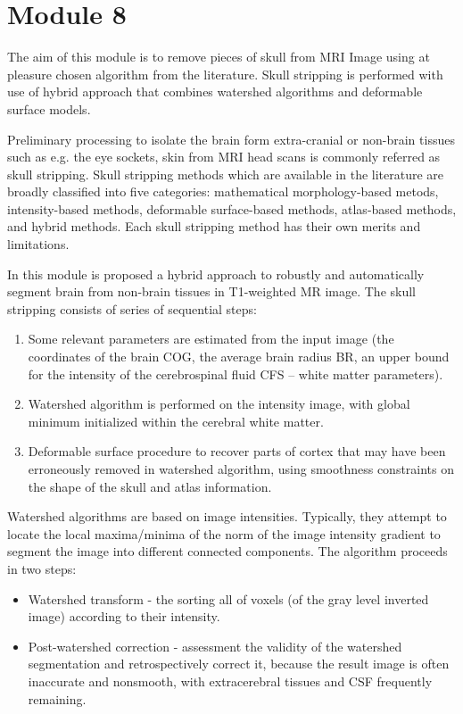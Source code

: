 \section{Module 8}

The aim of this module is to remove pieces of skull from MRI Image using at pleasure chosen algorithm from the literature. Skull stripping is performed with use of hybrid approach that combines watershed algorithms and deformable surface models.

Preliminary processing to isolate the brain form extra-cranial or non-brain tissues such as e.g. the eye sockets, skin from MRI head scans is commonly referred as skull stripping. Skull stripping methods which are available in the literature are broadly classified into five categories: mathematical morphology-based metods, intensity-based methods, deformable surface-based methods, atlas-based methods, and hybrid methods. Each skull stripping method has their own merits and limitations. 

In this module is proposed a hybrid approach to robustly and automatically segment brain from non-brain tissues in T1-weighted MR image. The skull stripping consists of series of sequential steps:

\begin{enumerate}
    \item{Some relevant parameters are estimated from the input image (the coordinates of the brain COG, the average brain radius BR, an upper bound for the intensity of the cerebrospinal fluid CFS – white matter parameters).}
    \item{Watershed algorithm is performed on the intensity image, with global minimum initialized within the cerebral white matter.}
    \item{Deformable surface procedure to recover parts of cortex that may have been erroneously removed in watershed algorithm, using smoothness constraints on the shape of the skull and atlas information.}
\end{enumerate}

Watershed algorithms are based on image intensities. Typically, they attempt to locate the local maxima/minima of the norm of the image intensity gradient to segment the image into different  connected components. The algorithm proceeds in two steps:

\begin{itemize}  
\item{Watershed transform - the sorting all of voxels (of the gray level inverted image) according to their intensity.}
\item{Post-watershed correction - assessment the validity of the watershed segmentation and retrospectively correct it, because the result image is often inaccurate and nonsmooth, with extracerebral tissues and CSF frequently remaining.}
\end{itemize}

